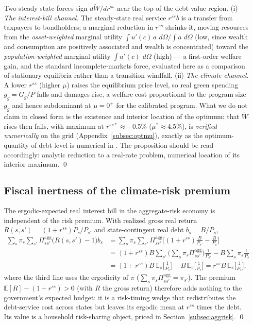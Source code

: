 \documentclass[12pt]{article}
\newcommand{\E}{\mathbb{E}}
\newcommand{\dd}{\,d}
\begin{document}
Two steady-state forces sign $d\widetilde W/dr^{ss}$ near the top of the
debt-value region. (i) \emph{The interest-bill channel.} The steady-state real
service $r^{ss}b$ is a transfer from taxpayers to bondholders; a marginal
reduction in $r^{ss}$ shrinks it, moving resources from the
\emph{asset-weighted} marginal utility $\int u'(c)\,a\,\dd\Omega/\int a\,\dd\Omega$
(low, since wealth and consumption are positively associated and wealth is
concentrated) toward the \emph{population-weighted} marginal utility
$\int u'(c)\,\dd\Omega$ (high) --- a first-order welfare gain, and the standard
incomplete-markets force, evaluated here as a comparison of stationary equilibria
rather than a transition windfall. (ii) \emph{The climate channel.} A lower
$r^{ss}$ (higher $\mu$) raises the equilibrium price level, so real green
spending $g_g=G_g/P$ falls and damages rise, a welfare cost proportional to the
program size $g_g$ and hence subdominant at $\mu=0^{+}$ for the calibrated
program. What we do not claim in closed form is the existence and interior
location of the optimum: that $\widetilde W$ rises then falls, with maximum at
$r^{ss*}\approx-0.5\%$ ($\mu^{*}\approx4.5\%$), is \emph{verified numerically}
on the grid (Appendix~\ref{subsec:optmu}), exactly as the optimum-quantity-of-debt
level is numerical in \citet{aiyagarimcgrattan1998}. The proposition should be
read accordingly: analytic reduction to a real-rate problem, numerical location
of its interior maximum. \qed

\subsection{Fiscal inertness of the climate-risk premium}
The ergodic-expected real interest bill in the aggregate-risk economy is
independent of the risk premium. With realized gross real return
$R(s,s')=(1+r^{ss})P_s/P_{s'}$ and state-contingent real debt $b_s=B/P_s$,
\begin{align*}
\sum_s \pi_s \sum_{s'}\Pi^{\mathrm{agg}}_{ss'}\big(R(s,s')-1\big)b_s
&=\sum_s \pi_s \sum_{s'}\Pi^{\mathrm{agg}}_{ss'}
   \Big[(1+r^{ss})\tfrac{B}{P_{s'}}-\tfrac{B}{P_s}\Big]\\
&=(1+r^{ss})B\sum_{s'}\Big(\textstyle\sum_s \pi_s \Pi^{\mathrm{agg}}_{ss'}\Big)\tfrac{1}{P_{s'}}
  - B\sum_s \pi_s \tfrac{1}{P_s}\\
&=(1+r^{ss})B\,\E_\pi\!\big[\tfrac{1}{P_s}\big]-B\,\E_\pi\!\big[\tfrac{1}{P_s}\big]
  = r^{ss}B\,\E_\pi\!\big[\tfrac{1}{P_s}\big],
\end{align*}
where the third line uses the ergodicity of $\pi$
($\sum_s \pi_s \Pi^{\mathrm{agg}}_{ss'}=\pi_{s'}$). The premium
$\mathbb{E}[R]-(1+r^{ss})>0$ (with $R$ the gross return) therefore adds
nothing to the government's expected
budget: it is a risk-timing wedge that redistributes the debt-service cost
across states but leaves its ergodic mean at $r^{ss}$ times the debt. Its
value is a household risk-sharing object, priced in
Section~\ref{subsec:aggrisk}. \qed
\end{document}
